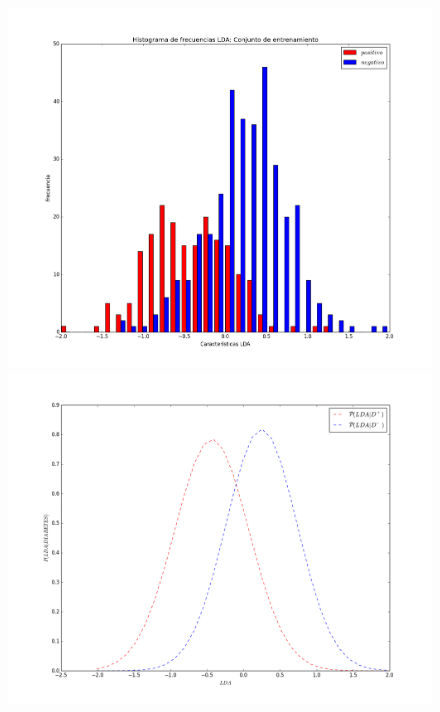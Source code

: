 \documentclass[letter, titlepage, 10pt]{article}
\begin{document}
\begin{appendices}
\begin{figure}
\centering
    \begin{minipage}{.5\textwidth}
        \centering
        \includegraphics[width=1\linewidth]{images/Histograma_D8}
    \end{minipage}%
    \begin{minipage}{.5\textwidth}
        \centering
        \includegraphics[width=1\linewidth]{images/PDF_D8}
    \end{minipage}

\end{figure}
\end{appendices}
\end{document}
